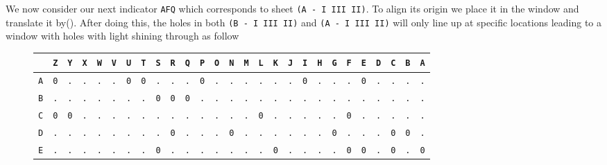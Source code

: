 \noindent We now consider our next indicator \texttt{AFQ} which corresponds to sheet \texttt{(A - I III II)}. To align its origin we place it in the window and translate it by(). After doing this, the holes in both \texttt{(B - I III II)} and \texttt{(A - I III II)} will only line up at specific locations leading to a window with holes with light shining through as follow
\begin{figure}[H]
	\begin{center}
		\scalebox{0.5} {
			\begin{tabular}{c|cccccccccccccccccccccccccc}
				           & \texttt{Z} & \texttt{Y} & \texttt{X} & \texttt{W} & \texttt{V} & \texttt{U} & \texttt{T} & \texttt{S} & \texttt{R} & \texttt{Q} & \texttt{P} & \texttt{O} & \texttt{N} & \texttt{M} & \texttt{L} & \texttt{K} & \texttt{J} & \texttt{I} & \texttt{H} & \texttt{G} & \texttt{F} & \texttt{E} & \texttt{D} & \texttt{C} & \texttt{B} & \texttt{A} \\ \hline
				\texttt{A} & \texttt{0} & \texttt{.} & \texttt{.} & \texttt{.} & \texttt{.} & \texttt{0} & \texttt{0} & \texttt{.} & \texttt{.} & \texttt{.} & \texttt{0} & \texttt{.} & \texttt{.} & \texttt{.} & \texttt{.} & \texttt{.} & \texttt{.} & \texttt{0} & \texttt{.} & \texttt{.} & \texttt{.} & \texttt{0} & \texttt{.} & \texttt{.} & \texttt{.} & \texttt{.} \\
				\texttt{B} & \texttt{.} & \texttt{.} & \texttt{.} & \texttt{.} & \texttt{.} & \texttt{.} & \texttt{.} & \texttt{0} & \texttt{0} & \texttt{0} & \texttt{.} & \texttt{.} & \texttt{.} & \texttt{.} & \texttt{.} & \texttt{.} & \texttt{.} & \texttt{.} & \texttt{.} & \texttt{.} & \texttt{.} & \texttt{.} & \texttt{.} & \texttt{.} & \texttt{.} & \texttt{.} \\
				\texttt{C} & \texttt{0} & \texttt{0} & \texttt{.} & \texttt{.} & \texttt{.} & \texttt{.} & \texttt{.} & \texttt{.} & \texttt{.} & \texttt{.} & \texttt{.} & \texttt{.} & \texttt{.} & \texttt{.} & \texttt{0} & \texttt{.} & \texttt{.} & \texttt{.} & \texttt{.} & \texttt{.} & \texttt{0} & \texttt{.} & \texttt{.} & \texttt{.} & \texttt{.} & \texttt{.} \\
				\texttt{D} & \texttt{.} & \texttt{.} & \texttt{.} & \texttt{.} & \texttt{.} & \texttt{.} & \texttt{.} & \texttt{.} & \texttt{0} & \texttt{.} & \texttt{.} & \texttt{.} & \texttt{0} & \texttt{.} & \texttt{.} & \texttt{.} & \texttt{.} & \texttt{.} & \texttt{.} & \texttt{0} & \texttt{.} & \texttt{.} & \texttt{.} & \texttt{0} & \texttt{0} & \texttt{.} \\
				\texttt{E} & \texttt{.} & \texttt{.} & \texttt{.} & \texttt{.} & \texttt{.} & \texttt{.} & \texttt{.} & \texttt{0} & \texttt{.} & \texttt{.} & \texttt{.} & \texttt{.} & \texttt{.} & \texttt{.} & \texttt{.} & \texttt{0} & \texttt{.} & \texttt{.} & \texttt{.} & \texttt{.} & \texttt{0} & \texttt{0} & \texttt{.} & \texttt{0} & \texttt{.} & \texttt{0} \\

\end{tabular}}
\end{center}
\end{figure}
